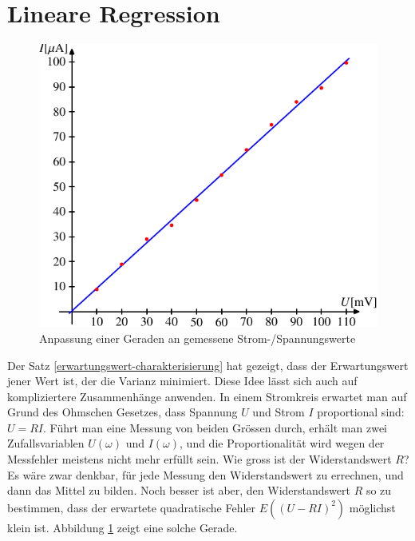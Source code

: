 \section{Lineare Regression}
\begin{figure}
\begin{center}
\includegraphics{images/regression-1.pdf}
\end{center}
\caption{Anpassung einer Geraden an gemessene
Strom-/Spannungswerte\label{ohm-regression}}
\end{figure}
Der Satz \ref{erwartungswert-charakterisierung} hat gezeigt, dass der
Erwartungswert jener Wert ist, der die Varianz minimiert.
Diese Idee
lässt sich auch auf kompliziertere Zusammenhänge anwenden.
In einem
Stromkreis erwartet man auf Grund des Ohmschen Gesetzes, dass Spannung $U$
und Strom $I$ proportional sind: $U=RI$.
Führt man eine Messung von beiden
Grössen durch, erhält man zwei Zufallsvariablen $U(\omega)$ und $I(\omega)$,
und die Proportionalität wird wegen der Messfehler meistens nicht mehr
erfüllt sein.
Wie gross ist der Widerstandswert $R$? Es wäre zwar denkbar,
für jede Messung den Widerstandswert zu errechnen, und dann das Mittel
zu bilden.
Noch besser ist aber, den Widerstandswert $R$ so zu bestimmen,
dass der erwartete quadratische Fehler
$E( (U-RI)^2)$
möglichst klein ist.
Abbildung \ref{ohm-regression} zeigt eine solche Gerade.


